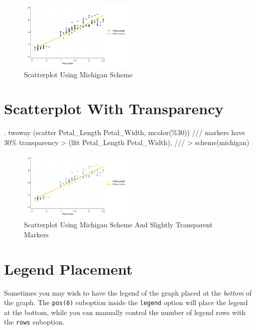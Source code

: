 \documentclass[
]{article}
\begin{document}
\begin{figure}
\centering
\includegraphics[width=0.5\textwidth,height=\textheight]{myscatter.png}
\caption{Scatterplot Using Michigan Scheme}
\end{figure}

\section{Scatterplot With
Transparency}\label{scatterplot-with-transparency}

\begin{stlog}
. twoway (scatter Petal_Length Petal_Width, mcolor(\%30)) /// markers have 30\% transparency
> (lfit Petal_Length Petal_Width), ///
> scheme(michigan)
\end{stlog}



\begin{figure}
\centering
\includegraphics[width=0.5\textwidth,height=\textheight]{myscatter2.png}
\caption{Scatterplot Using Michigan Scheme And Slightly Transparent
Markers}
\end{figure}

\section{Legend Placement}\label{legend-placement}

Sometimes you may wish to have the legend of the graph placed at the
\emph{bottom} of the graph. The \texttt{pos(6)} suboption inside the
\texttt{legend} option will place the legend at the bottom, while you
can manually control the number of legend rows with the \texttt{rows}
suboption.
\end{document}
